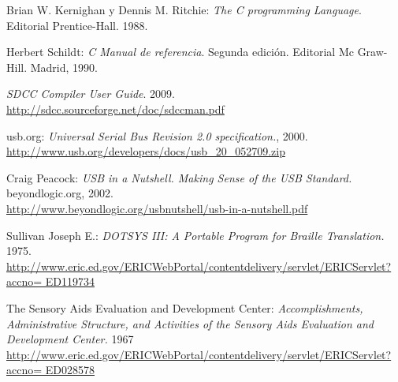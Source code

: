 \begin{thebibliography}{99}
 Brian W. Kernighan y Dennis M. Ritchie: \emph{The C
programming Language}. Editorial Prentice-Hall. 1988.

 Herbert Schildt: \emph{C Manual de referencia}. Segunda
edici\'on. Editorial Mc Graw-Hill. Madrid, 1990.

\emph{SDCC Compiler User Guide}. 2009.\\
\url{http://sdcc.sourceforge.net/doc/sdccman.pdf}

 usb.org: \emph{Universal Serial Bus Revision 2.0
specification.}, 2000.\\
\url{http://www.usb.org/developers/docs/usb_20_052709.zip}

 Craig Peacock: \emph{USB in a Nutshell. Making Sense of
the USB Standard.} beyondlogic.org, 2002.\\
\url{http://www.beyondlogic.org/usbnutshell/usb-in-a-nutshell.pdf} 

 Sullivan Joseph E.: \emph{DOTSYS III: A Portable Program for
Braille Translation.} 1975.\\
\url{
http://www.eric.ed.gov/ERICWebPortal/contentdelivery/servlet/ERICServlet?accno=
ED119734}

 The Sensory Aids Evaluation and Development Center:
\emph{Accomplishments, Administrative Structure, and Activities of the Sensory
Aids Evaluation and Development Center.} 1967\\
\url{
http://www.eric.ed.gov/ERICWebPortal/contentdelivery/servlet/ERICServlet?accno=
ED028578}
\end{thebibliography}